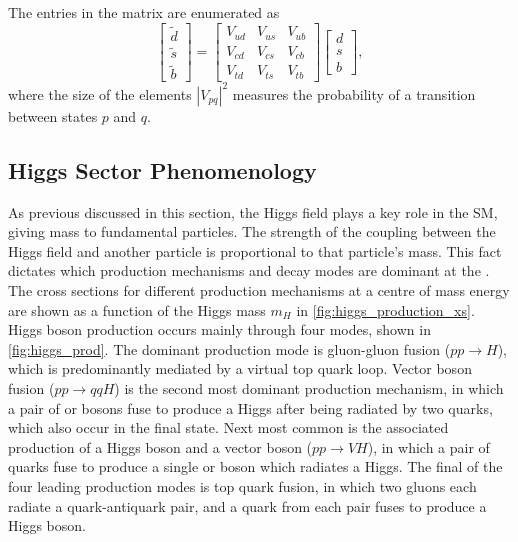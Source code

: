 The entries in the matrix are enumerated as
%
\begin{equation}
    \begin{bmatrix}
        \tilde{d} \\ \tilde{s} \\ \tilde{b} 
    \end{bmatrix}
    = \begin{bmatrix}
        V_{ud} & V_{us} & V_{ub} \\  
        V_{cd} & V_{cs} & V_{cb} \\  
        V_{td} & V_{ts} & V_{tb} 
    \end{bmatrix}
    \begin{bmatrix}
        {d} \\ {s} \\ {b} 
    \end{bmatrix} ,
\end{equation}
%
where the size of the elements $|V_{pq}|^2$ measures the probability of a transition between states $p$ and $q$.




\subsection{Higgs Sector Phenomenology}\label{sec:higgs_pheno}


As previous discussed in this section, the Higgs field plays a key role in the SM, giving mass to fundamental particles. 
The strength of the coupling between the Higgs field and another particle is proportional to that particle's mass.
This fact dictates which production mechanisms and decay modes are dominant at the \LHC.
The cross sections for different production mechanisms at a centre of mass energy  are shown as a function of the Higgs mass $m_H$ in \cref{fig:higgs_production_xs}.
Higgs boson production occurs mainly through four modes, shown in \cref{fig:higgs_prod}.
The dominant production mode is gluon-gluon fusion ($pp \rightarrow H$), which is predominantly mediated by a virtual top quark loop.
Vector boson fusion ($pp \rightarrow qqH$) is the second most dominant production mechanism, in which a pair of \Wboson or \Zboson bosons fuse to produce a Higgs after being radiated by two quarks, which also occur in the final state.
Next most common is the associated production of a Higgs boson and a vector boson ($pp \rightarrow VH$), in which a pair of quarks fuse to produce a single \Wboson or \Zboson boson which radiates a Higgs.
The final of the four leading production modes is top quark fusion, in which two gluons each radiate a quark-antiquark pair, and a quark from each pair fuses to produce a Higgs boson.

